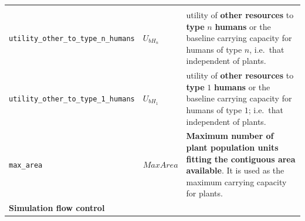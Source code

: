 \documentclass[
]{book}
\begin{document}
\begin{longtable}[]{@{}lll@{}}
\begin{minipage}[t]{0.40\columnwidth}
\end{minipage}\tabularnewline
\begin{minipage}[t]{0.27\columnwidth}\raggedright
\texttt{utility\_other\_to\_type\_n\_humans}\strut
\end{minipage} & \begin{minipage}[t]{0.25\columnwidth}\raggedright
\(U_{bH_{n}}\)\strut
\end{minipage} & \begin{minipage}[t]{0.40\columnwidth}\raggedright
utility of \textbf{other resources} to \textbf{type} \(n\) \textbf{humans} or the baseline carrying capacity for humans of type \(n\), i.e.~that independent of plants.\strut
\end{minipage}\tabularnewline
\begin{minipage}[t]{0.27\columnwidth}\raggedright
\texttt{utility\_other\_to\_type\_1\_humans}\strut
\end{minipage} & \begin{minipage}[t]{0.25\columnwidth}\raggedright
\(U_{bH_{1}}\)\strut
\end{minipage} & \begin{minipage}[t]{0.40\columnwidth}\raggedright
utility of \textbf{other resources} to \textbf{type} \(1\) \textbf{humans} or the baseline carrying capacity for humans of type \(1\); i.e.~that independent of plants.\strut
\end{minipage}\tabularnewline
\begin{minipage}[t]{0.27\columnwidth}\raggedright
\texttt{max\_area}\strut
\end{minipage} & \begin{minipage}[t]{0.25\columnwidth}\raggedright
\(MaxArea\)\strut
\end{minipage} & \begin{minipage}[t]{0.40\columnwidth}\raggedright
\textbf{Maximum number of plant population units fitting the contiguous area available}. It is used as the maximum carrying capacity for plants.\strut
\end{minipage}\tabularnewline
\begin{minipage}[t]{0.27\columnwidth}\raggedright
\textbf{Simulation flow control}\strut
\end{minipage} & \begin{minipage}[t]{0.25\columnwidth}\raggedright
\strut
\end{minipage} & \begin{minipage}[t]{0.40\columnwidth}\raggedright
\strut
\end{minipage}\tabularnewline

\end{longtable}
\end{document}
